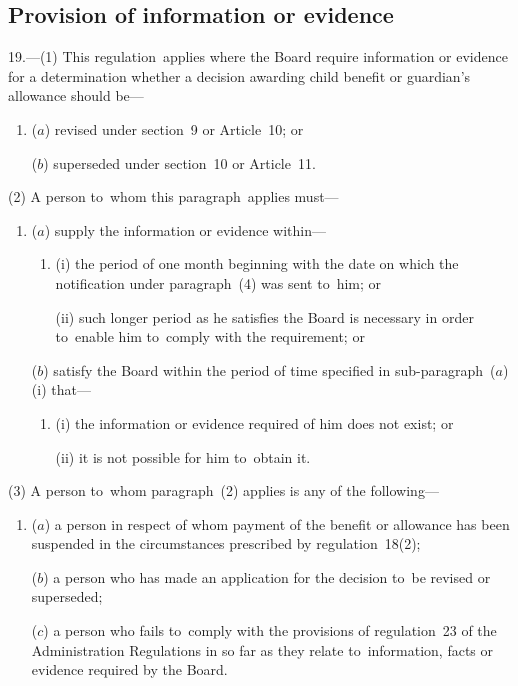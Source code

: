\documentclass[12pt,a4paper]{article}
\begin{document}
\subsection[19. Provision of information or evidence]{Provision of information or evidence}

19.---(1)  This regulation~applies where the Board require information or evidence for a determination whether a decision awarding child benefit or guardian’s allowance should be—
\begin{enumerate}\item[]
($a$) revised under section~9 or Article~10; or

($b$) superseded under section~10 or Article~11.
\end{enumerate}

(2) A person to~whom this paragraph~applies must—
\begin{enumerate}\item[]
($a$) supply the information or evidence within—
\begin{enumerate}\item[]
(i) the period of one month beginning with the date on which the notification under paragraph~(4) was sent to~him; or

(ii) such longer period as he satisfies the Board is necessary in order to~enable him to~comply with the requirement; or
\end{enumerate}

($b$) satisfy the Board within the period of time specified in sub-\hspace{0pt}paragraph~($a$)(i)  that—
\begin{enumerate}\item[]
(i) the information or evidence required of him does not exist; or

(ii) it is not possible for him to~obtain it.
\end{enumerate}
\end{enumerate}

(3) A person to~whom paragraph~(2) applies is any of the following—
\begin{enumerate}\item[]
($a$) a person in respect of whom payment of the benefit or allowance has been suspended in the circumstances prescribed by regulation~18(2);

($b$) a person who has made an application for the decision to~be revised or superseded;

($c$) a person who fails to~comply with the provisions of regulation~23 of the Administration Regulations in so far as they relate to~information, facts or evidence required by the Board.
\end{enumerate}
\end{document}
